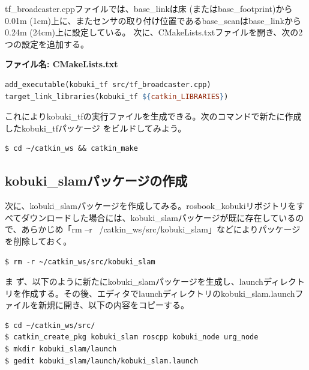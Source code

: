 tf\_broadcaster.cppファイルでは、base\_linkは床 (またはbase\_footprint)から0.01m (1cm)上に、またセンサの取り付け位置であるbase\_scanはbase\_linkから0.24m (24cm)上に設定している。
次に、CMakeLists.txtファイルを開き、次の2つの設定を追加する。

\textbf{ファイル名: CMakeLists.txt}
\begin{lstlisting}[language=make]
add_executable(kobuki_tf src/tf_broadcaster.cpp)
target_link_libraries(kobuki_tf ${catkin_LIBRARIES})
\end{lstlisting}

これによりkobuki\_tfの実行ファイルを生成できる。次のコマンドで新たに作成したkobuki\_tfパッケージ  をビルドしてみよう。

\begin{lstlisting}[language=ROS]
$ cd ~/catkin_ws && catkin_make
\end{lstlisting}

\subsection{kobuki\_slamパッケージの作成}

次に、kobuki\_slamパッケージを作成してみる。rosbook\_kobukiリポジトリをすべてダウンロードした場合には、kobuki\_slamパッケージが既に存在しているので、あらかじめ「rm –r ~/catkin\_ws/src/kobuki\_slam」などによりパッケージを削除しておく。

\begin{lstlisting}[language=ROS]
$ rm -r ~/catkin_ws/src/kobuki_slam
\end{lstlisting}

ま  ず、以下のように新たにkobuki\_slamパッケージを生成し、launchディレクトリを作成する。その後、エディタでlaunchディレクトリのkobuki\_slam.launchファイルを新規に開き、以下の内容をコピーする。

\begin{lstlisting}[language=ROS]
$ cd ~/catkin_ws/src/
$ catkin_create_pkg kobuki_slam roscpp kobuki_node urg_node
$ mkdir kobuki_slam/launch
$ gedit kobuki_slam/launch/kobuki_slam.launch
\end{lstlisting}

